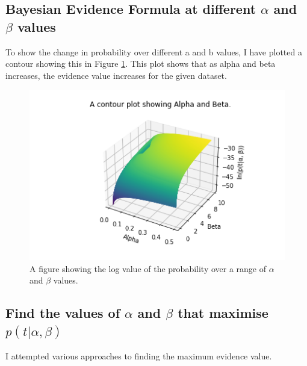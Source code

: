 \documentclass[a4paper, 11pt]{article}
\begin{document}
\subsection{Bayesian Evidence Formula at different $\alpha$ and $\beta$ values}
To show the change in probability over different a and b values, I have plotted a contour showing this in Figure \ref*{fig:abcontourplot}. This plot shows that as alpha and beta increases, the evidence value increases for the given dataset.
\begin{figure}[h]
    \begin{center}
    \includegraphics[width=16cm]{fig/contourplot.png}
    \caption{A figure showing the log value of the probability over a range of $\alpha$ and $\beta$ values.}
    \label{fig:abcontourplot}     
\end{center}
\end{figure}

\subsection{Find the values of $\alpha$ and $\beta$ that maximise $p(t|\alpha, \beta)$}

I attempted various approaches to finding the maximum evidence value.
\end{document}
